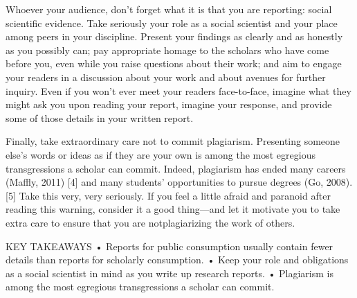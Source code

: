 Whoever your audience, don’t forget what it is that you are reporting: social scientific evidence. Take seriously your role as a social scientist and your place among peers in your discipline. Present your findings as clearly and as honestly as you possibly can; pay appropriate homage to the scholars who have come before you, even while you raise questions about their work; and aim to engage your readers in a discussion about your work and about avenues for further inquiry. Even if you won’t ever meet your readers face-to-face, imagine what they might ask you upon reading your report, imagine your response, and provide some of those details in your written report.

Finally, take extraordinary care not to commit plagiarism. Presenting someone else’s words or ideas as if they are your own is among the most egregious transgressions a scholar can commit. Indeed, plagiarism has ended many careers (Maffly, 2011) [4] and many students’ opportunities to pursue degrees (Go, 2008). [5] Take this very, very seriously. If you feel a little afraid and paranoid after reading this warning, consider it a good thing—and let it motivate you to take extra care to ensure that you are notplagiarizing the work of others.

KEY TAKEAWAYS
• Reports for public consumption usually contain fewer details than reports for scholarly consumption.
• Keep your role and obligations as a social scientist in mind as you write up research reports.
• Plagiarism is among the most egregious transgressions a scholar can commit.

